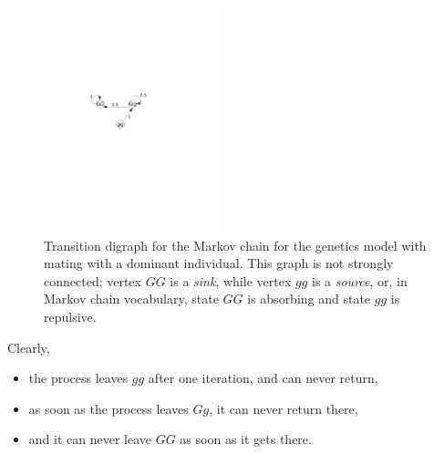 \begin{figure}[htbp]
\begin{center}
\includegraphics[width=0.45\textwidth]{../figs_08_genetics/graphe_dominant}
\caption{Transition digraph for the Markov chain for the genetics model with mating with a dominant individual. This graph is not strongly connected; vertex $GG$ is a \emph{sink}, while vertex $gg$ is a \emph{source}, or, in Markov chain vocabulary, state $GG$ is absorbing and state $gg$ is repulsive.}
\label{fig:Markov_graph2}
\end{center}
\end{figure}


Clearly,
\begin{itemize}
\item the process leaves $gg$ after one iteration, and can never return,
\item as soon as the process leaves $Gg$, it can never return there,
\item and it can never leave $GG$ as soon as it gets there.
\end{itemize}

